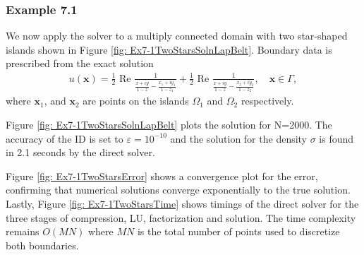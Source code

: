 \documentclass{sfuthesis}
\begin{document}

\subsubsection{Example 7.1}
We now apply the solver to a multiply connected domain with two star-shaped islands shown in Figure \ref{fig: Ex7-1TwoStarsSolnLapBelt}. Boundary data is prescribed from the exact solution 
\begin{align}
	u(\mathbf{x})=\frac{1}{2} \text{ Re } \frac{1}{{\displaystyle \frac{x+iy}{1-z} - \frac{x_1+iy_1}{1-z_1}}}+ \frac{1}{2} \text{ Re } \frac{1}{{\displaystyle \frac{x+iy}{1-z} - \frac{x_2+iy_2}{1-z_2}}}, \quad \mathbf{x}\in \Gamma, \label{eq: MultConnRefSoln} 
\end{align}
where $\mathbf{x}_1$, and $\mathbf{x}_2$ are points on the islands $\Omega_1$ and $\Omega_2$ respectively. 

Figure \ref{fig: Ex7-1TwoStarsSolnLapBelt} plots the solution for N=2000. The accuracy of the ID is set to $\varepsilon=10^{-10}$ and the solution for the density $\sigma$ is found in 2.1 seconds by the direct solver. 

Figure \ref{fig: Ex7-1TwoStarsError} shows a convergence plot for the error, confirming that numerical solutions converge exponentially to the true solution. 
Lastly, Figure \ref{fig: Ex7-1TwoStarsTime} shows timings of the direct solver for the three stages of compression, LU, factorization and solution. The time complexity remains $O(MN)$ where $MN$ is the total number of points used to discretize both boundaries. 
\end{document}
